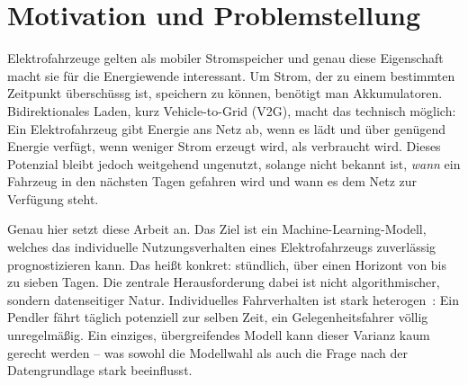 \documentclass[11pt,a4paper,twocolumn]{scrartcl}
\begin{document}
\pagestyle{empty}
\thispagestyle{empty}
\raggedbottom

\vspace{-0.8em}

\section{Motivation und Problemstellung}

Elektrofahrzeuge gelten als mobiler Stromspeicher und genau diese Eigenschaft macht sie für die Energiewende interessant. Um Strom, der zu einem bestimmten Zeitpunkt überschüssg ist, speichern zu können, benötigt man Akkumulatoren. Bidirektionales Laden, kurz Vehicle-to-Grid (V2G), macht das technisch möglich: Ein Elektrofahrzeug gibt Energie ans Netz ab, wenn es lädt und über genügend Energie verfügt, wenn weniger Strom erzeugt wird, als verbraucht wird. Dieses Potenzial bleibt jedoch weitgehend ungenutzt, solange nicht bekannt ist, \emph{wann} ein Fahrzeug in den nächsten Tagen gefahren wird und wann es dem Netz zur Verfügung steht.

Genau hier setzt diese Arbeit an. Das Ziel ist ein Machine-Learning-Modell, welches das individuelle Nutzungsverhalten eines Elektrofahrzeugs zuverlässig prognostizieren kann. Das heißt konkret: stündlich, über einen Horizont von bis zu sieben Tagen. Die zentrale Herausforderung dabei ist nicht algorithmischer, sondern datenseitiger Natur. Individuelles Fahrverhalten ist stark heterogen~\cite{ji2023rethinking}: Ein Pendler fährt täglich potenziell zur selben Zeit, ein Gelegenheitsfahrer völlig unregelmäßig. Ein einziges, übergreifendes Modell kann dieser Varianz kaum gerecht werden -- was sowohl die Modellwahl als auch die Frage nach der Datengrundlage stark beeinflusst.
\end{document}
